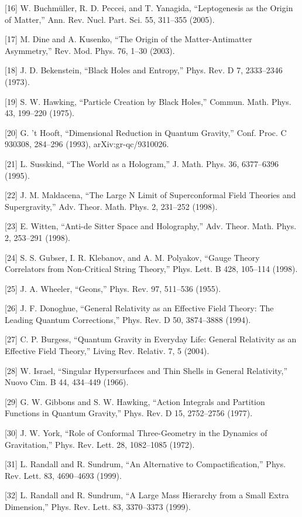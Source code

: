 \documentclass[aps,prd,onecolumn,superscriptaddress,nofootinbib,longbibliography,10pt]{revtex4-2}
\begin{document}
  [16] W. Buchmüller, R. D. Peccei, and T. Yanagida, “Leptogenesis as the Origin of Matter,” Ann. Rev. Nucl. Part. Sci. 55, 311–355 (2005).


  [17] M. Dine and A. Kusenko, “The Origin of the Matter-Antimatter Asymmetry,” Rev. Mod. Phys. 76, 1–30 (2003).


  [18] J. D. Bekenstein, “Black Holes and Entropy,” Phys. Rev. D 7, 2333–2346 (1973).


  [19] S. W. Hawking, “Particle Creation by Black Holes,” Commun. Math. Phys. 43, 199–220 (1975).


  [20] G. ’t Hooft, “Dimensional Reduction in Quantum Gravity,” Conf. Proc. C 930308, 284–296 (1993), arXiv:gr-qc/9310026.


  [21] L. Susskind, “The World as a Hologram,” J. Math. Phys. 36, 6377–6396 (1995).


  [22] J. M. Maldacena, “The Large N Limit of Superconformal Field Theories and Supergravity,” Adv. Theor. Math. Phys. 2, 231–252 (1998).


  [23] E. Witten, “Anti-de Sitter Space and Holography,” Adv. Theor. Math. Phys. 2, 253–291 (1998).


  [24] S. S. Gubser, I. R. Klebanov, and A. M. Polyakov, “Gauge Theory Correlators from Non-Critical String Theory,” Phys. Lett. B 428, 105–114 (1998).


  [25] J. A. Wheeler, “Geons,” Phys. Rev. 97, 511–536 (1955).


  [26] J. F. Donoghue, “General Relativity as an Effective Field Theory: The Leading Quantum Corrections,” Phys. Rev. D 50, 3874–3888 (1994).


  [27] C. P. Burgess, “Quantum Gravity in Everyday Life: General Relativity as an Effective Field Theory,” Living Rev. Relativ. 7, 5 (2004).


  [28] W. Israel, “Singular Hypersurfaces and Thin Shells in General Relativity,” Nuovo Cim. B 44, 434–449 (1966).


  [29] G. W. Gibbons and S. W. Hawking, “Action Integrals and Partition Functions in Quantum Gravity,” Phys. Rev. D 15, 2752–2756 (1977).


  [30] J. W. York, “Role of Conformal Three-Geometry in the Dynamics of Gravitation,” Phys. Rev. Lett. 28, 1082–1085 (1972).


  [31] L. Randall and R. Sundrum, “An Alternative to Compactification,” Phys. Rev. Lett. 83, 4690–4693 (1999).


  [32] L. Randall and R. Sundrum, “A Large Mass Hierarchy from a Small Extra Dimension,” Phys. Rev. Lett. 83, 3370–3373 (1999).
\end{document}
